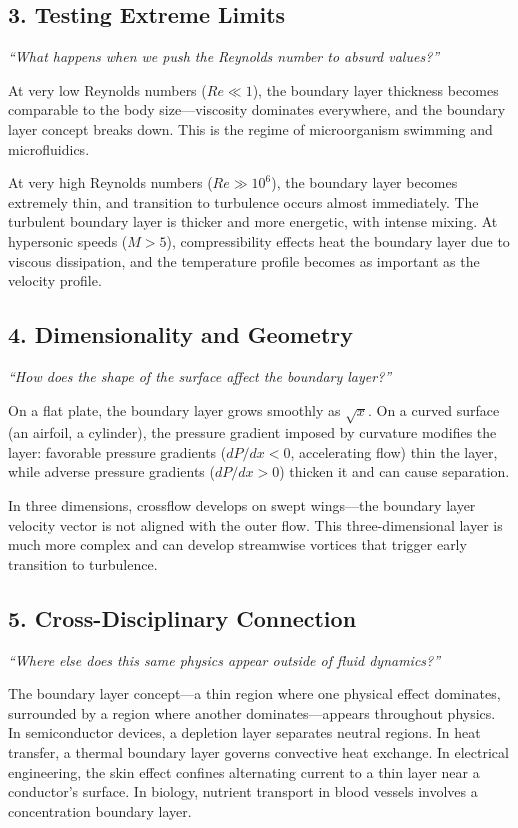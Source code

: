 \documentclass[11pt,openright]{book}
\begin{document}
\subsection*{3. Testing Extreme Limits}
\textit{``What happens when we push the Reynolds number to absurd values?''}

At very low Reynolds numbers ($Re \ll 1$), the boundary layer thickness becomes comparable to the body size---viscosity dominates everywhere, and the boundary layer concept breaks down. This is the regime of microorganism swimming and microfluidics.

At very high Reynolds numbers ($Re \gg 10^6$), the boundary layer becomes extremely thin, and transition to turbulence occurs almost immediately. The turbulent boundary layer is thicker and more energetic, with intense mixing. At hypersonic speeds ($M > 5$), compressibility effects heat the boundary layer due to viscous dissipation, and the temperature profile becomes as important as the velocity profile.

\subsection*{4. Dimensionality and Geometry}
\textit{``How does the shape of the surface affect the boundary layer?''}

On a flat plate, the boundary layer grows smoothly as $\sqrt{x}$. On a curved surface (an airfoil, a cylinder), the pressure gradient imposed by curvature modifies the layer: favorable pressure gradients ($dP/dx < 0$, accelerating flow) thin the layer, while adverse pressure gradients ($dP/dx > 0$) thicken it and can cause separation.

In three dimensions, crossflow develops on swept wings---the boundary layer velocity vector is not aligned with the outer flow. This three-dimensional layer is much more complex and can develop streamwise vortices that trigger early transition to turbulence.

\subsection*{5. Cross-Disciplinary Connection}
\textit{``Where else does this same physics appear outside of fluid dynamics?''}

The boundary layer concept---a thin region where one physical effect dominates, surrounded by a region where another dominates---appears throughout physics. In semiconductor devices, a depletion layer separates neutral regions. In heat transfer, a thermal boundary layer governs convective heat exchange. In electrical engineering, the skin effect confines alternating current to a thin layer near a conductor's surface. In biology, nutrient transport in blood vessels involves a concentration boundary layer.
\end{document}
